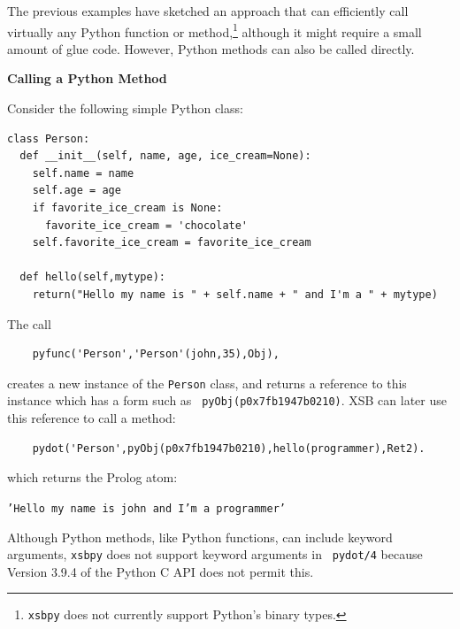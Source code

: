 The previous examples have sketched an approach that can efficiently
call virtually any Python function or method,\footnote{{\tt xsbpy}
  does not currently support Python's binary types.}  although it
might require a small amount of glue code.  However, Python methods can
also be called directly.

\begin{example} \rm {\bf Calling a Python Method} \label{xsbpy-examp:method}

\noindent
Consider the following simple Python class:

\begin{verbatim}
class Person:
  def __init__(self, name, age, ice_cream=None):
    self.name = name
    self.age = age
    if favorite_ice_cream is None:
      favorite_ice_cream = 'chocolate'
    self.favorite_ice_cream = favorite_ice_cream

  def hello(self,mytype):
    return("Hello my name is " + self.name + " and I'm a " + mytype)
\end{verbatim}

\noindent
The call

\begin{verbatim}
    pyfunc('Person','Person'(john,35),Obj),
\end{verbatim}
\noindent
creates a new instance of the {\tt Person} class, and returns a
reference to this instance which has a form such as {\tt
  pyObj(p0x7fb1947b0210)}.  XSB can later use this reference to call a
method:
\begin{verbatim}
    pydot('Person',pyObj(p0x7fb1947b0210),hello(programmer),Ret2).
\end{verbatim}

\noindent
which returns the Prolog atom:

{\tt 'Hello my name is john and I'm a programmer'}

\noindent
Although Python methods, like Python functions, can include keyword
arguments, {\tt xsbpy} does not support keyword arguments in {\tt
  pydot/4} because Version 3.9.4 of the Python C API does not permit
this.
\end{example}

